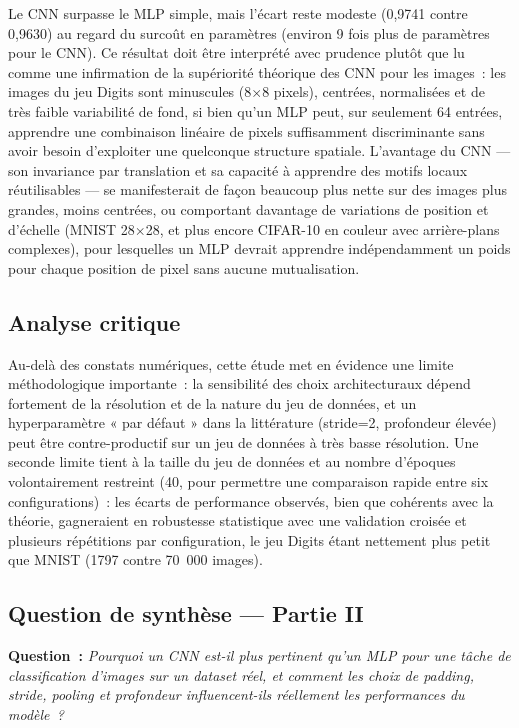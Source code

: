 \documentclass[11pt,a4paper]{article}
\begin{document}
Le CNN surpasse le MLP simple, mais l'écart reste modeste (0,9741 contre 0,9630) au regard du surcoût en paramètres (environ 9 fois plus de paramètres pour le CNN). Ce résultat doit être interprété avec prudence plutôt que lu comme une infirmation de la supériorité théorique des CNN pour les images~: les images du jeu Digits sont minuscules (8$\times$8 pixels), centrées, normalisées et de très faible variabilité de fond, si bien qu'un MLP peut, sur seulement 64 entrées, apprendre une combinaison linéaire de pixels suffisamment discriminante sans avoir besoin d'exploiter une quelconque structure spatiale. L'avantage du CNN --- son invariance par translation et sa capacité à apprendre des motifs locaux réutilisables --- se manifesterait de façon beaucoup plus nette sur des images plus grandes, moins centrées, ou comportant davantage de variations de position et d'échelle (MNIST 28$\times$28, et plus encore CIFAR-10 en couleur avec arrière-plans complexes), pour lesquelles un MLP devrait apprendre indépendamment un poids pour chaque position de pixel sans aucune mutualisation.

\subsection{Analyse critique}

Au-delà des constats numériques, cette étude met en évidence une limite méthodologique importante~: la sensibilité des choix architecturaux dépend fortement de la résolution et de la nature du jeu de données, et un hyperparamètre « par défaut » dans la littérature (stride=2, profondeur élevée) peut être contre-productif sur un jeu de données à très basse résolution. Une seconde limite tient à la taille du jeu de données et au nombre d'époques volontairement restreint (40, pour permettre une comparaison rapide entre six configurations)~: les écarts de performance observés, bien que cohérents avec la théorie, gagneraient en robustesse statistique avec une validation croisée et plusieurs répétitions par configuration, le jeu Digits étant nettement plus petit que MNIST (1797 contre 70~000 images).

\subsection{Question de synthèse --- Partie II}

\noindent\textbf{Question~:} \textit{Pourquoi un CNN est-il plus pertinent qu'un MLP pour une tâche de classification d'images sur un dataset réel, et comment les choix de padding, stride, pooling et profondeur influencent-ils réellement les performances du modèle~?}
\end{document}
